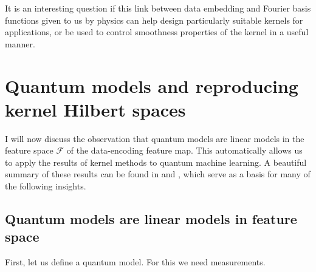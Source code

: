\documentclass[aps, reprint, onecolumn, nofootinbib, longbibliography]{revtex4-2}
\begin{document}
It is an interesting question if this link between data embedding and Fourier basis functions given to us by physics can help design particularly suitable kernels for applications, or be used to control smoothness properties of the kernel in a useful manner. 


\section{Quantum models and reproducing kernel Hilbert spaces}\label{sec:models_rkhs}

I will now discuss the observation that quantum models are linear models in the feature space $\mathcal{F}$ of the data-encoding feature map. This automatically allows us to apply the results of kernel methods to quantum machine learning. A beautiful summary of these results can be found in \cite{steinwart2008support} and \cite{scholkopf2002learning}, which serve as a basis for many of the following insights.

\subsection{Quantum models are linear models in feature space}\label{ssec:linear}

First, let us define a quantum model. For this we need measurements.
\end{document}
